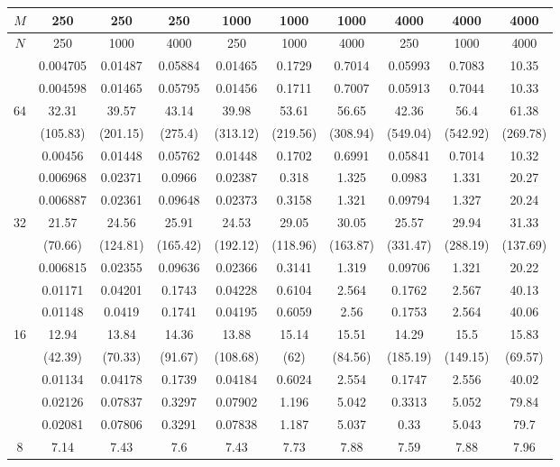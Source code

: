 \begin{table}[h]
\centering
\begin{tabular}{c|c|c|c|c|c|c|c|c|c|}
\hline
$M$ & 250 & 250 & 250 & 1000 & 1000 & 1000 & 4000 & 4000 & 4000 \\
\hline
$N$ & 250 & 1000 & 4000 & 250 & 1000 & 4000 & 250 & 1000 & 4000 \\
\hline
 & 0.004705 & 0.01487 & 0.05884 & 0.01465 & 0.1729 & 0.7014 & 0.05993 & 0.7083 & 10.35 \\
 & 0.004598 & 0.01465 & 0.05795 & 0.01456 & 0.1711 & 0.7007 & 0.05913 & 0.7044 & 10.33 \\
64 & 32.31 & 39.57 & 43.14 & 39.98 & 53.61 & 56.65 & 42.36 & 56.4 & 61.38 \\
 & (105.83) & (201.15) & (275.4) & (313.12) & (219.56) & (308.94) & (549.04) & (542.92) & (269.78) \\
 & 0.00456 & 0.01448 & 0.05762 & 0.01448 & 0.1702 & 0.6991 & 0.05841 & 0.7014 & 10.32 \\
\hline
 & 0.006968 & 0.02371 & 0.0966 & 0.02387 & 0.318 & 1.325 & 0.0983 & 1.331 & 20.27 \\
 & 0.006887 & 0.02361 & 0.09648 & 0.02373 & 0.3158 & 1.321 & 0.09794 & 1.327 & 20.24 \\
32 & 21.57 & 24.56 & 25.91 & 24.53 & 29.05 & 30.05 & 25.57 & 29.94 & 31.33 \\
 & (70.66) & (124.81) & (165.42) & (192.12) & (118.96) & (163.87) & (331.47) & (288.19) & (137.69) \\
 & 0.006815 & 0.02355 & 0.09636 & 0.02366 & 0.3141 & 1.319 & 0.09706 & 1.321 & 20.22 \\
\hline
 & 0.01171 & 0.04201 & 0.1743 & 0.04228 & 0.6104 & 2.564 & 0.1762 & 2.567 & 40.13 \\
 & 0.01148 & 0.0419 & 0.1741 & 0.04195 & 0.6059 & 2.56 & 0.1753 & 2.564 & 40.06 \\
16 & 12.94 & 13.84 & 14.36 & 13.88 & 15.14 & 15.51 & 14.29 & 15.5 & 15.83 \\
 & (42.39) & (70.33) & (91.67) & (108.68) & (62) & (84.56) & (185.19) & (149.15) & (69.57) \\
 & 0.01134 & 0.04178 & 0.1739 & 0.04184 & 0.6024 & 2.554 & 0.1747 & 2.556 & 40.02 \\
\hline
 & 0.02126 & 0.07837 & 0.3297 & 0.07902 & 1.196 & 5.042 & 0.3313 & 5.052 & 79.84 \\
 & 0.02081 & 0.07806 & 0.3291 & 0.07838 & 1.187 & 5.037 & 0.33 & 5.043 & 79.7 \\
8 & 7.14 & 7.43 & 7.6 & 7.43 & 7.73 & 7.88 & 7.59 & 7.88 & 7.96 \\

\end{tabular}
\end{table}
